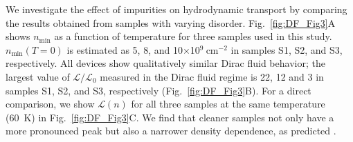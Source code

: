 We investigate the effect of impurities on hydrodynamic transport by comparing the results obtained from samples with varying disorder. Fig.~\ref{fig:DF_Fig3}A shows $n_{\mathrm{min}}$ as a function of temperature for three samples used in this study. $n_{\mathrm{min}}(T=0)$ is estimated as 5, 8, and 10$\times$10$^9~$cm$^{-2}$ in samples S1, S2, and S3, respectively. All devices show qualitatively similar Dirac fluid behavior; the largest value of $\mathcal{L}/\mathcal{L}_0$ measured in the Dirac fluid regime is 22, 12 and 3 in samples S1, S2, and S3, respectively (Fig.~\ref{fig:DF_Fig3}B). For a direct comparison, we show $\mathcal{L}(n)$ for all three samples at the same temperature (60~K) in Fig.~\ref{fig:DF_Fig3}C. We find that cleaner samples not only have a more pronounced peak but also a narrower density dependence, as predicted \cite{muller_quantum-critical_2008, foster_slow_2009}.

